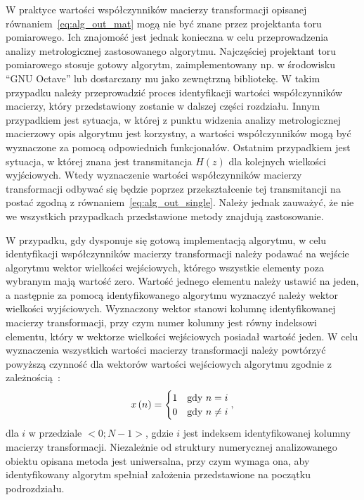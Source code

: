 W praktyce wartości współczynników macierzy transformacji opisanej równaniem~\eqref{eq:alg_out_mat} mogą nie być znane przez projektanta toru pomiarowego. Ich znajomość jest jednak konieczna w celu przeprowadzenia analizy metrologicznej zastosowanego algorytmu. Najczęściej projektant toru pomiarowego stosuje gotowy algorytm, zaimplementowany np. w środowisku \enquote{GNU Octave} lub dostarczany mu jako zewnętrzną bibliotekę. W takim przypadku należy przeprowadzić proces identyfikacji wartości współczynników macierzy, który przedstawiony zostanie w dalszej części rozdziału. Innym przypadkiem jest sytuacja, w której z punktu widzenia analizy metrologicznej macierzowy opis algorytmu jest korzystny, a wartości współczynników mogą być wyznaczone za pomocą odpowiednich funkcjonałów. Ostatnim przypadkiem jest sytuacja, w której znana jest transmitancja $H(z)$ dla kolejnych wielkości wyjściowych. Wtedy wyznaczenie wartości współczynników macierzy transformacji odbywać się będzie poprzez przekształcenie tej transmitancji na postać zgodną z równaniem~\eqref{eq:alg_out_single}. Należy jednak zauważyć, że nie we wszystkich przypadkach przedstawione metody znajdują zastosowanie.

W przypadku, gdy dysponuje się gotową implementacją algorytmu, w celu identyfikacji współczynników macierzy transformacji należy podawać na wejście algorytmu wektor wielkości wejściowych, którego wszystkie elementy poza wybranym mają wartość zero. Wartość jednego elementu należy ustawić na jeden, a następnie za pomocą identyfikowanego algorytmu wyznaczyć należy wektor wielkości wyjściowych. Wyznaczony wektor stanowi kolumnę identyfikowanej macierzy transformacji, przy czym numer kolumny jest równy indeksowi elementu, który w wektorze wielkości wejściowych posiadał wartość jeden. W celu wyznaczenia wszystkich wartości macierzy transformacji należy powtórzyć powyższą czynność dla wektorów wartości wejściowych algorytmu zgodnie z zależnością~\cite{jakubiec_algorithms}:
\begin{equation}
x \emb{n} =
\begin{cases}
	1 & $gdy$~n = i \\
	0 & $gdy$~n \neq i
\end{cases}
\label{eq:wt_ident},
\end{equation}
dla $i$ w przedziale $<0;N-1>$, gdzie $i$ jest indeksem identyfikowanej kolumny macierzy transformacji. Niezależnie od struktury numerycznej analizowanego obiektu opisana metoda jest uniwersalna, przy czym wymaga ona, aby identyfikowany algorytm spełniał założenia przedstawione na początku podrozdziału.

